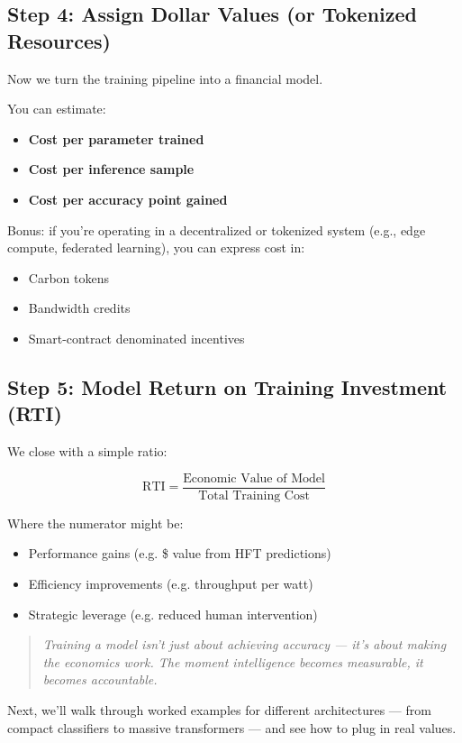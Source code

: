 \subsection{Step 4: Assign Dollar Values (or Tokenized Resources)}

Now we turn the training pipeline into a financial model.

You can estimate:

\begin{itemize}
  \item \textbf{Cost per parameter trained}
  \item \textbf{Cost per inference sample}
  \item \textbf{Cost per accuracy point gained}
\end{itemize}

Bonus: if you're operating in a decentralized or tokenized system (e.g., edge compute, federated learning), you can express cost in:

\begin{itemize}
    \item Carbon tokens
    \item Bandwidth credits
    \item Smart-contract denominated incentives
\end{itemize}

\subsection{Step 5: Model Return on Training Investment (RTI)}

We close with a simple ratio:

\[
\text{RTI} = \frac{\text{Economic Value of Model}}{\text{Total Training Cost}}
\]

Where the numerator might be:

\begin{itemize}
    \item Performance gains (e.g. \$ value from HFT predictions)
    \item Efficiency improvements (e.g. throughput per watt)
    \item Strategic leverage (e.g. reduced human intervention)
\end{itemize}

\begin{quote}
\textit{Training a model isn’t just about achieving accuracy — it’s about making the economics work. The moment intelligence becomes measurable, it becomes accountable.}
\end{quote}

\vspace{1em}
\noindent
Next, we’ll walk through worked examples for different architectures — from compact classifiers to massive transformers — and see how to plug in real values.
